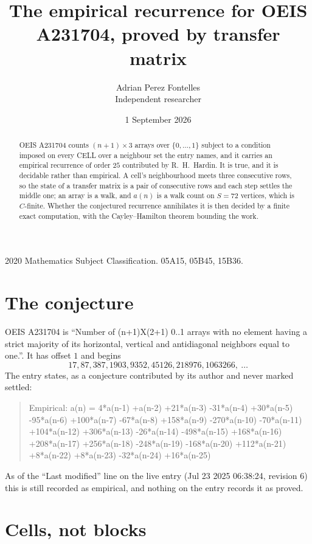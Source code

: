 \documentclass[11pt,a4paper]{article}
\title{The empirical recurrence for OEIS A231704, proved by transfer matrix}
\author{Adrian Perez Fontelles\\ \small Independent researcher}
\date{1 September 2026}
\theoremstyle{plain}
\theoremstyle{definition}
\begin{document}
\maketitle

\begin{abstract}
OEIS A231704 counts $(n+1)\times3$ arrays over $\{0,\dots,1\}$ subject to a condition imposed on
every CELL over a neighbour set the entry names, and it carries an empirical recurrence of
order $25$ contributed by R.~H.~Hardin. It is true, and it is decidable rather than
empirical. A cell's neighbourhood meets three consecutive rows, so the state of a transfer
matrix is a pair of consecutive rows and each step settles the middle one; an array is a
walk, and $a(n)$ is a walk count on $S=72$ vertices, which is $C$-finite. Whether the
conjectured recurrence annihilates it is then decided by a finite exact computation, with the
Cayley--Hamilton theorem bounding the work.
\end{abstract}

\noindent\small 2020 Mathematics Subject Classification. 05A15, 05B45, 15B36.\normalsize

\section{The conjecture}

OEIS A231704 is ``Number of (n+1)X(2+1) 0..1 arrays with no element having a strict majority of its horizontal, vertical and antidiagonal neighbors equal to one.''. It has offset $1$ and begins
\[
17, 87, 387, 1903, 9352, 45126, 218976, 1063266,\ \dots
\]
The entry states, as a conjecture contributed by its author and never marked settled:
\begin{quote}
Empirical: a(n) = 4*a(n-1) +a(n-2) +21*a(n-3) -31*a(n-4) +30*a(n-5) -95*a(n-6) +100*a(n-7) -67*a(n-8) +158*a(n-9) -270*a(n-10) -70*a(n-11) +104*a(n-12) +306*a(n-13) -26*a(n-14) -498*a(n-15) +168*a(n-16) +208*a(n-17) +256*a(n-18) -248*a(n-19) -168*a(n-20) +112*a(n-21) +8*a(n-22) +8*a(n-23) -32*a(n-24) +16*a(n-25)
\end{quote}
As of the ``Last modified'' line on the live entry (Jul 23 2025 06:38:24, revision 6) this is still
recorded as empirical, and nothing on the entry records it as proved.

\section{Cells, not blocks}
\end{document}
